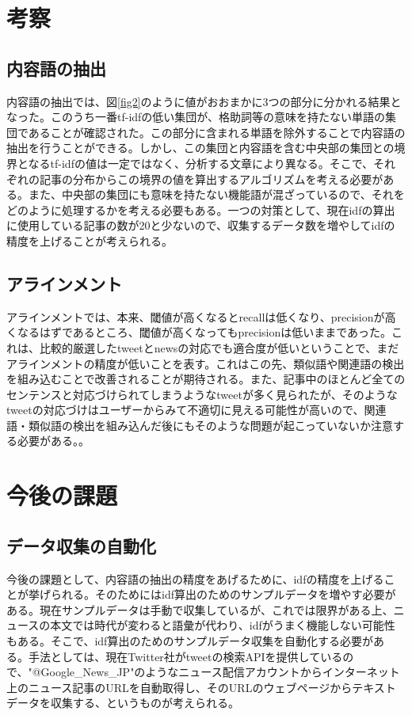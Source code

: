 \documentclass[12pt]{jarticle}
\begin{document}
\section{考察}
\subsection{内容語の抽出}
内容語の抽出では、図\ref{fig2}のように値がおおまかに3つの部分に分かれる結果となった。このうち一番tf-idfの低い集団が、格助詞等の意味を持たない単語の集団であることが確認された。この部分に含まれる単語を除外することで内容語の抽出を行うことができる。しかし、この集団と内容語を含む中央部の集団との境界となるtf-idfの値は一定ではなく、分析する文章により異なる。そこで、それぞれの記事の分布からこの境界の値を算出するアルゴリズムを考える必要がある。また、中央部の集団にも意味を持たない機能語が混ざっているので、それをどのように処理するかを考える必要もある。一つの対策として、現在idfの算出に使用している記事の数が20と少ないので、収集するデータ数を増やしてidfの精度を上げることが考えられる。

\subsection{アラインメント}
アラインメントでは、本来、閾値が高くなるとrecallは低くなり、precisionが高くなるはずであるところ、閾値が高くなってもprecisionは低いままであった。これは、比較的厳選したtweetとnewsの対応でも適合度が低いということで、まだアラインメントの精度が低いことを表す。これはこの先、類似語や関連語の検出を組み込むことで改善されることが期待される。また、記事中のほとんど全てのセンテンスと対応づけられてしまうようなtweetが多く見られたが、そのようなtweetの対応づけはユーザーからみて不適切に見える可能性が高いので、関連語・類似語の検出を組み込んだ後にもそのような問題が起こっていないか注意する必要がある。。

\section{今後の課題}
\subsection{データ収集の自動化}
今後の課題として、内容語の抽出の精度をあげるために、idfの精度を上げることが挙げられる。そのためにはidf算出のためのサンプルデータを増やす必要がある。現在サンプルデータは手動で収集しているが、これでは限界がある上、ニュースの本文では時代が変わると語彙が代わり、idfがうまく機能しない可能性もある。そこで、idf算出のためのサンプルデータ収集を自動化する必要がある。手法としては、現在Twitter社がtweetの検索APIを提供しているので、"@Google\_News\_JP"のようなニュース配信アカウントからインターネット上のニュース記事のURLを自動取得し、そのURLのウェブページからテキストデータを収集する、というものが考えられる。
\end{document}
